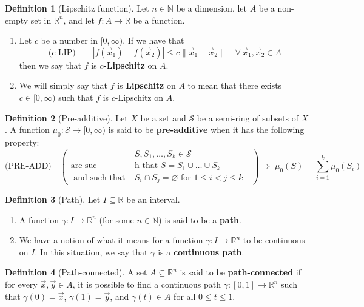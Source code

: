 \documentclass[11pt]{article}
\theoremstyle{definition}
\newtheorem*{defn*}{Definition}
\newcommand{\N}{\ensuremath{\mathbb{N}}}
\newcommand{\R}{\ensuremath{\mathbb{R}}}
\begin{document}
\begin{defn*}[Lipschitz function]
Let $n \in \N$ be a dimension, let $A$ be a non-empty set in $\R^n$, and let $f : A \to \R$ be a function.\vspace{-1.5ex}
\begin{enumerate}[(1)]
\item Let $c$ be a number in $[0, \infty)$. If we have that
$$\text{($c$-LIP)} \quad\quad  |f(\vec{x}_1) - f(\vec{x}_2)| \leq c \|\vec{x}_1 - \vec{x}_2\| \quad \forall \, \vec{x}_1, \vec{x}_2 \in A$$
then we say that $f$ is {\bf $c$-Lipschitz} on $A$.
\item We will simply say that $f$ is {\bf Lipschitz} on $A$ to mean that there exists $c \in [0, \infty)$ such that $f$ is $c$-Lipschitz on $A$.
\end{enumerate}\vspace{-1.5ex}
\end{defn*}

\begin{defn*}[Pre-additive]
Let $X$ be a set and $\mathcal{S}$ be a semi-ring of subsets of $X$. A function $\mu_0 : \mathcal{S} \to [0, \infty)$ is said to be {\bf pre-additive} when it has the following property:
\[ \text{(PRE-ADD)} \quad \left( \begin{aligned} & S, S_1, \dots, S_k \in \mathcal{S} \\ \text{are suc} & \text{h that $S = S_1 \cup \dots \cup S_k$} \\ \text{ and such that } & \text{$S_i \cap S_j = \varnothing$ for $1 \leq i < j \leq k$ } \end{aligned} \right) \Rightarrow \; \mu_0(S) = \sum_{i=1}^k \mu_0(S_i) \]
\end{defn*}

\newpage
\begin{defn*}[Path]
Let $I \subseteq \R$ be an interval. \vspace{-0.3cm}
\begin{enumerate}[(1)]
\item A function $\gamma : I \to \R^n$ (for some $n \in \N$) is said to be a {\bf path}.
\item We have a notion of what it means for a function $\gamma : I \to \R^n$ to be continuous on $I$. In this situation, we say that $\gamma$ is a {\bf continuous path}. 
\end{enumerate}
\end{defn*}

\begin{defn*}[Path-connected]
A set $A \subseteq \R^n$ is said to be {\bf path-connected} if for every $\vec{x}, \vec{y} \in A$, it is possible to find a continuous path $\gamma : [0, 1] \to \R^n$ such that $\gamma(0) = \vec{x}$, $\gamma(1) = \vec{y}$, and $\gamma(t) \in A$ for all $0 \leq t \leq 1$. 
\end{defn*}
\end{document}
